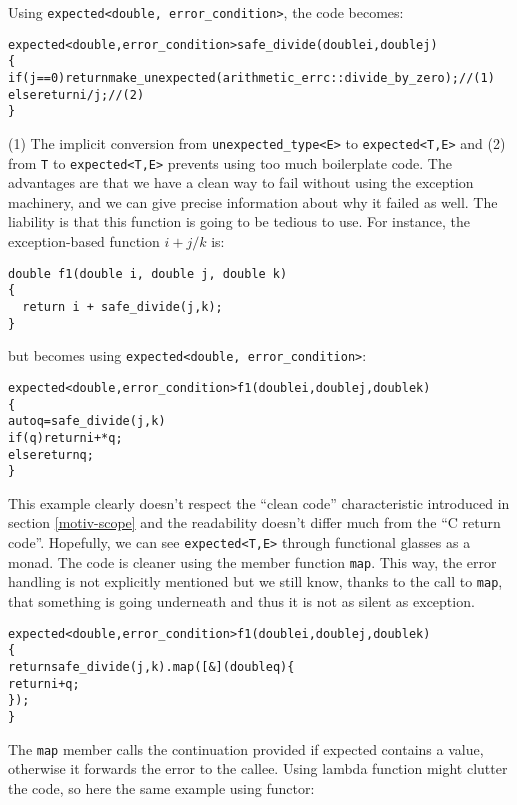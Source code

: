 \documentclass[a4paper,10pt]{article}
\newcommand{\cpp}[1]{\lstinline{#1}}
\begin{document}
\noindent
Using \cpp{expected<double, error_condition>}, the code becomes:

\begin{alltt}
expected<double,error_condition> safe_divide(double i, double j)
\{
  if (j==0) return make_unexpected(arithmetic_errc::divide_by_zero); // (1)
  else return i / j; // (2)
\}
\end{alltt}

(1) The implicit conversion from \cpp{unexpected_type<E>} to \cpp{expected<T,E>} and (2) from \cpp{T} to \cpp{expected<T,E>} prevents using too much boilerplate code. The advantages are that we have a clean way to fail without using the exception machinery, and we can give precise information about why it failed as well. The liability is that this function is going to be tedious to use. For instance, the exception-based function $i + j/k$ is:

\begin{lstlisting}
double f1(double i, double j, double k)
{
  return i + safe_divide(j,k);
}
\end{lstlisting}

\noindent
but becomes using \cpp{expected<double, error_condition>}:

\begin{alltt}
expected<double, error_condition> f1(double i, double j, double k)
\{
  auto q = safe_divide(j, k)
  if(q) return i + *q;
  else return q;
\}
\end{alltt}

\noindent
This example clearly doesn't respect the ``clean code'' characteristic introduced in section \ref{motiv-scope} and the readability doesn't differ much from the ``C return code''. Hopefully, we can see \cpp{expected<T,E>} through functional glasses as a monad. The code is cleaner using the member function \cpp{map}. This way, the error handling is not explicitly mentioned but we still know, thanks to the call to \cpp{map}, that something is going underneath and thus it is not as silent as exception.

\begin{alltt}
expected<double, error_condition> f1(double i, double j, double k)
\{
  return safe_divide(j, k).map([&](double q)\{
    return i + q;
  \});
\}
\end{alltt}

The \cpp{map} member calls the continuation provided if expected contains a value, otherwise it forwards the error to the callee. Using lambda function might clutter the code, so here the same example using functor:
\end{document}

